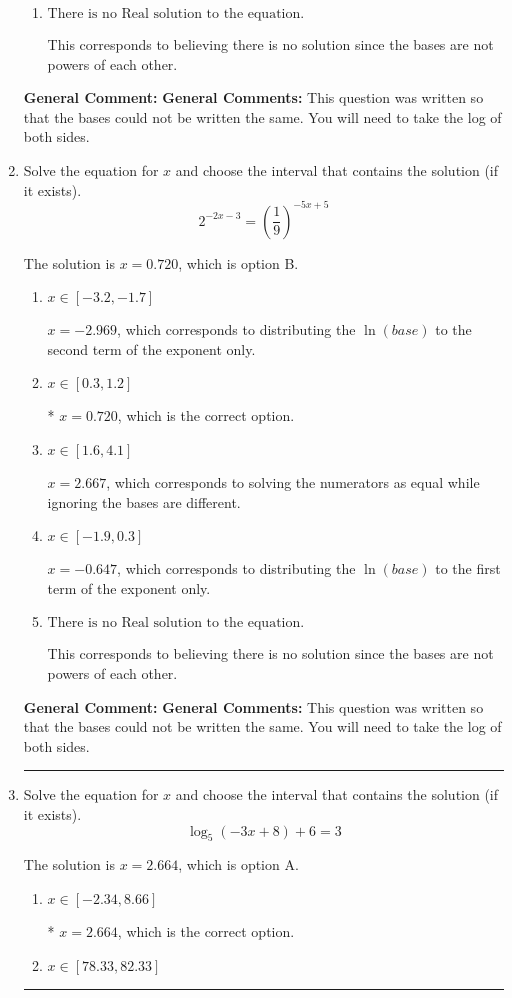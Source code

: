 \documentclass{extbook}[14pt]
\newcommand{\litem}[1]{\item #1

\rule{\textwidth}{0.4pt}}
\begin{document}
\begin{enumerate}
{\begin{enumerate}[label=\Alph*.]
* $x = -1.153$, which is the correct option.
\item \( \text{There is no Real solution to the equation.} \)

This corresponds to believing there is no solution since the bases are not powers of each other.
\end{enumerate}

\textbf{General Comment:} \textbf{General Comments:} This question was written so that the bases could not be written the same. You will need to take the log of both sides.
}
\litem{
Solve the equation for $x$ and choose the interval that contains the solution (if it exists).
\[ 2^{-2x-3} = \left(\frac{1}{9}\right)^{-5x+5} \]

The solution is \( x = 0.720 \), which is option B.\begin{enumerate}[label=\Alph*.]
\item \( x \in [-3.2, -1.7] \)

$x = -2.969$, which corresponds to distributing the $\ln(base)$ to the second term of the exponent only.
\item \( x \in [0.3, 1.2] \)

* $x = 0.720$, which is the correct option.
\item \( x \in [1.6, 4.1] \)

$x = 2.667$, which corresponds to solving the numerators as equal while ignoring the bases are different.
\item \( x \in [-1.9, 0.3] \)

$x = -0.647$, which corresponds to distributing the $\ln(base)$ to the first term of the exponent only.
\item \( \text{There is no Real solution to the equation.} \)

This corresponds to believing there is no solution since the bases are not powers of each other.
\end{enumerate}

\textbf{General Comment:} \textbf{General Comments:} This question was written so that the bases could not be written the same. You will need to take the log of both sides.
}
\litem{
Solve the equation for $x$ and choose the interval that contains the solution (if it exists).
\[ \log_{5}{(-3x+8)}+6 = 3 \]

The solution is \( x = 2.664 \), which is option A.\begin{enumerate}[label=\Alph*.]
\item \( x \in [-2.34, 8.66] \)

* $x = 2.664$, which is the correct option.
\item \( x \in [78.33, 82.33] \)


\end{enumerate}}
\end{enumerate}
\end{document}
